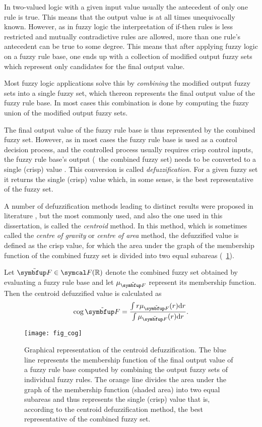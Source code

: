 In two-valued logic with a given input value usually the antecedent of only one rule is true. This means that the output value is at all times unequivocally known. However, as in fuzzy logic the interpretation of if-then rules is less restricted and mutually contradictive rules are allowed, more than one rule's antecedent can be true to some degree. This means that after applying fuzzy logic on a fuzzy rule base, one ends up with a collection of modified output fuzzy sets which represent only candidates for the final output value.

Most fuzzy logic applications solve this by \emph{combining} the modified output fuzzy sets into a single fuzzy set, which thereon represents the final output value of the fuzzy rule base. In most cases this combination is done by computing the fuzzy union of the modified output fuzzy sets.

The final output value of the fuzzy rule base is thus represented by the combined fuzzy set. However, as in most cases the fuzzy rule base is used as a control decision process, and the controlled process usually requires crisp control inputs, the fuzzy rule base's output (\ie\ the combined fuzzy set) needs to be converted to a single (crisp) value \cite{klir:1995,mendel:2001}. This conversion is called \emph{defuzzification}. For a given fuzzy set it returns the single (crisp) value which, in some sense, is the best representative of the fuzzy set.

A number of defuzzification methods leading to distinct results were proposed in literature \cite{dubois:1980,klir:1995,mendel:2001,pedrycz:1993,zimmermann:2001}, but the most commonly used, and also the one used in this dissertation, is called the \emph{centroid} method. In this method, which is sometimes called the \emph{centre of gravity} or \emph{centre of area} method, the defuzzified value is defined as the crisp value, for which the area under the graph of the membership function of the combined fuzzy set is divided into two equal subareas (\fig~\ref{fig:cog}).

Let $\fset{F} \in \fpowset{\R}$ denote the combined fuzzy set obtained by evaluating a fuzzy rule base and let $\mu_\fset{F}$ represent its membership function. Then the centroid defuzzified value is calculated as
\begin{equation}
  \cog\fset{F}=\frac{\int r \mu_\fset{F}(r)\mathrm{d}r}{\int\mu_\fset{F}(r)\mathrm{d}r}.
\end{equation}

\begin{figure}
  \vspace*{5mm}
  \texttt{[image: fig\_cog]}
  \vspace*{5mm}
  \caption{Graphical representation of the centroid defuzzification. The blue line represents the membership function of the final output value of a fuzzy rule base computed by combining the output fuzzy sets of individual fuzzy rules. The orange line divides the area under the graph of the membership function (shaded area) into two equal subareas and thus represents the single (crisp) value that is, according to the centroid defuzzification method, the best representative of the combined fuzzy set.}
  \label{fig:cog}
\end{figure}
